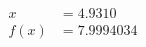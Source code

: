 \documentclass[preview]{standalone}
\begin{document}
\begin{align*}
x &= 4.9310\\f(x) &= 7.9994034
\end{align*}
\end{document}
